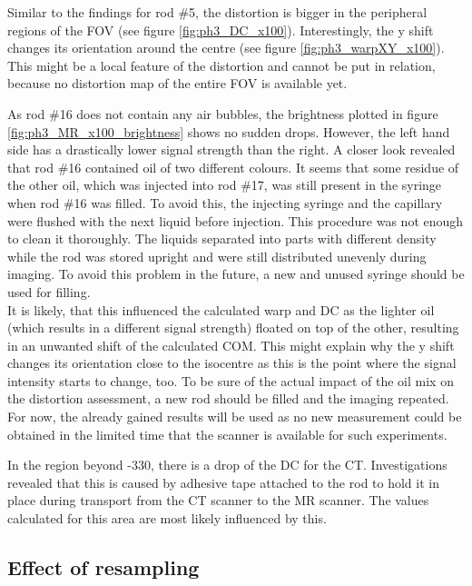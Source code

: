 Similar to the findings for rod \#5, the distortion is bigger in the peripheral regions of the FOV (see figure \ref{fig:ph3_DC_x100}).
Interestingly, the y shift changes its orientation around the centre (see figure \ref{fig:ph3_warpXY_x100}).
This might be a local feature of the distortion and cannot be put in relation, because no distortion map of the entire FOV is available yet.

As rod \#16 does not contain any air bubbles, the brightness plotted in figure \ref{fig:ph3_MR_x100_brightness} shows no sudden drops.
However, the left hand side has a drastically lower signal strength than the right.
A closer look revealed that rod \#16 contained oil of two different colours.
It seems that some residue of the other oil, which was injected into rod \#17, was still present in the syringe when rod \#16 was filled.
To avoid this, the injecting syringe and the capillary were flushed with the next liquid before injection.
This procedure was not enough to clean it thoroughly.
The liquids separated into parts with different density while the rod was stored upright and were still distributed unevenly during imaging.
To avoid this problem in the future, a new and unused syringe should be used for filling.\\

It is likely, that this influenced the calculated warp and DC as the lighter oil (which results in a different signal strength) floated on top of the other, resulting in an unwanted shift of the calculated COM.
This might explain why the y shift changes its orientation close to the isocentre as this is the point where the signal intensity starts to change, too.
To be sure of the actual impact of the oil mix on the distortion assessment, a new rod should be filled and the imaging repeated.
For now, the already gained results will be used as no new measurement could be obtained in the limited time that the scanner is available for such experiments.


In the region beyond -330, there is a drop of the DC for the CT.
Investigations revealed that this is caused by adhesive tape attached to the rod to hold it in place during transport from the CT scanner to the MR scanner.
The values calculated for this area are most likely influenced by this.


\subsection{Effect of resampling}


